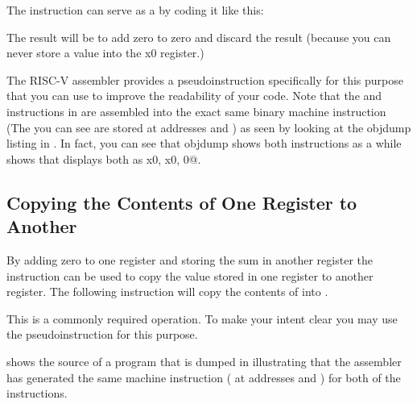 The  instruction can serve as a  by coding it like this:


The result will be to add zero to zero and discard the result (because you
can never store a value into the x0 register.)

The RISC-V assembler provides a pseudoinstruction specifically for this 
purpose that you can use to improve the readability of your code.  Note 
that the  and  instructions in 
are assembled into the exact same binary machine instruction (The
 you can see are stored at addresses  and )
as seen by looking at the objdump listing in .
In fact, you can see that objdump shows both instructions as a 
while  shows that \rvddt{} displays both as 
\verb@addi x0, x0, 0@.  





\subsection{Copying the Contents of One Register to Another}

By adding zero to one register and storing the sum in another register
the  instruction can be used to copy the value stored in one
register to another register.  The following instruction will copy
the contents of  into .


This is a commonly required operation.  To make your intent clear
you may use the  pseudoinstruction for this purpose.  

 shows the source of a program that is dumped in 
 illustrating that the assembler has generated the
same machine instruction ( at addresses  and ) 
for both of the instructions.

